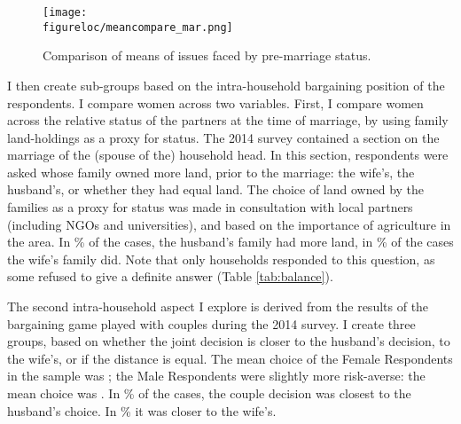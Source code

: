 \documentclass[10pt,a4paper,abstract=on]{scrartcl} %
\newcommand{\figureloc}{C:/Users/Koen/Dropbox/PhD/Papers/CongoGBV/Figures}
\begin{document}
\begin{figure}[htb]
  \texttt{[image: \\figureloc/meancompare\_mar.png]}
  \caption{Comparison of means of issues faced by pre-marriage status.}
  \label{fig:meancompare_mar}
\end{figure}

I then create sub-groups based on the intra-household bargaining position of the respondents. I compare women across two variables. First, I compare women across the relative status of the partners at the time of marriage, by using family land-holdings as a proxy for status. The 2014 survey contained a section on the marriage of the (spouse of the) household head. In this section, respondents were asked whose family owned more land, prior to the marriage: the wife's, the husband's, or whether they had equal land. The choice of land owned by the families as a proxy for status was made in consultation with local partners (including NGOs and universities), and based on the importance of agriculture in the area. In \% of the cases, the husband's family had more land, in \% of the cases the wife's family did. Note that only  households responded to this question, as some refused to give a definite answer (Table \ref{tab:balance}). 

The second intra-household aspect I explore is derived from the results of the bargaining game played with couples during the 2014 survey. I create three groups, based on whether the joint decision is closer to the husband's decision, to the wife's, or if the distance is equal. The mean choice of the Female Respondents in the sample was ; the Male Respondents were slightly more risk-averse: the mean choice was . In \% of the cases, the couple decision was closest to the husband's choice. In \% it was closer to the wife's.
\end{document}
